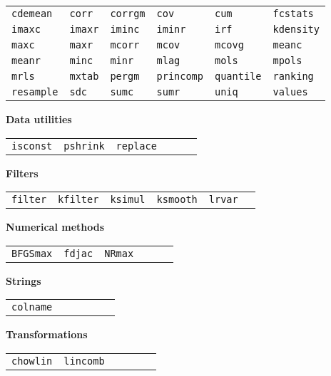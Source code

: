 \begin{tabular}{p{\cwid}p{\cwid}p{\cwid}p{\cwid}p{\cwid}p{\cwid}}
\texttt{cdemean} &
\texttt{corr} &
\texttt{corrgm} &
\texttt{cov} &
\texttt{cum} &
\texttt{fcstats} \\
\texttt{imaxc} &
\texttt{imaxr} &
\texttt{iminc} &
\texttt{iminr} &
\texttt{irf} &
\texttt{kdensity} \\
\texttt{maxc} &
\texttt{maxr} &
\texttt{mcorr} &
\texttt{mcov} &
\texttt{mcovg} &
\texttt{meanc} \\
\texttt{meanr} &
\texttt{minc} &
\texttt{minr} &
\texttt{mlag} &
\texttt{mols} &
\texttt{mpols} \\
\texttt{mrls} &
\texttt{mxtab} &
\texttt{pergm} &
\texttt{princomp} &
\texttt{quantile} &
\texttt{ranking} \\
\texttt{resample} &
\texttt{sdc} &
\texttt{sumc} &
\texttt{sumr} &
\texttt{uniq} &
\texttt{values} \\ [4pt]
\end{tabular}

\textbf{Data utilities}
\hrulefill

\begin{tabular}{p{\cwid}p{\cwid}p{\cwid}p{\cwid}p{\cwid}p{\cwid}}
\texttt{isconst} &
\texttt{pshrink} &
\texttt{replace} & & & \\ [4pt]
\end{tabular}

\textbf{Filters}
\hrulefill

\begin{tabular}{p{\cwid}p{\cwid}p{\cwid}p{\cwid}p{\cwid}p{\cwid}}
\texttt{filter} &
\texttt{kfilter} &
\texttt{ksimul} &
\texttt{ksmooth} &
\texttt{lrvar} & \\ [4pt]
\end{tabular}

\textbf{Numerical methods}
\hrulefill

\begin{tabular}{p{\cwid}p{\cwid}p{\cwid}p{\cwid}p{\cwid}p{\cwid}}
\texttt{BFGSmax} &
\texttt{fdjac} &
\texttt{NRmax} & & & \\ [4pt]
\end{tabular}

\textbf{Strings}
\hrulefill

\begin{tabular}{p{\cwid}p{\cwid}p{\cwid}p{\cwid}p{\cwid}p{\cwid}}
\texttt{colname} & & & & & \\ [4pt]
\end{tabular}

\textbf{Transformations}
\hrulefill

\begin{tabular}{p{\cwid}p{\cwid}p{\cwid}p{\cwid}p{\cwid}p{\cwid}}
\texttt{chowlin} &
\texttt{lincomb} & & & & \\ [4pt]
\end{tabular}


